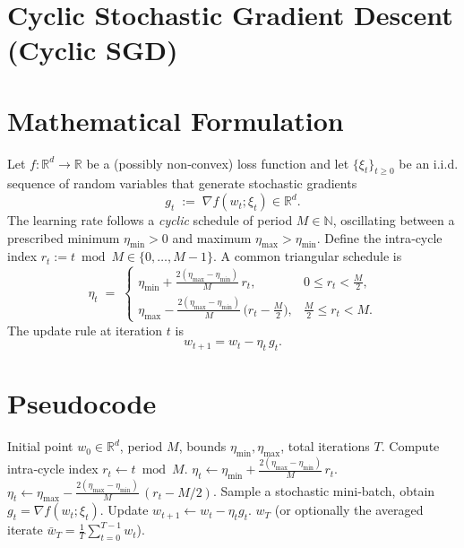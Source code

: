 \documentclass{article}
\newcommand{\R}{\mathbb{R}}
\begin{document}
\section*{Cyclic Stochastic Gradient Descent (Cyclic SGD)}

\section*{Mathematical Formulation}
Let $f:\R^{d}\rightarrow\R$ be a (possibly non‑convex) loss function and let
$\{ \xi_t\}_{t\ge 0}$ be an i.i.d. sequence of random variables that generate
stochastic gradients 
\[
g_t \;:=\; \nabla f(w_t;\xi_t)\in\R^{d}.
\]
The learning rate follows a \emph{cyclic} schedule of period $M\in\mathbb{N}$,
oscillating between a prescribed minimum $\eta_{\min}>0$ and maximum
$\eta_{\max}> \eta_{\min}$.  
Define the intra‑cycle index $r_t:=t\bmod M\in\{0,\dots,M-1\}$.  
A common triangular schedule is
\[
\boxed{
\eta_t \;=\;
\begin{cases}
\displaystyle 
\eta_{\min}+\frac{2(\eta_{\max}-\eta_{\min})}{M}\,r_t,
      & 0\le r_t < \frac{M}{2},\\[2ex]
\displaystyle 
\eta_{\max}-\frac{2(\eta_{\max}-\eta_{\min})}{M}\,
      \bigl(r_t-\tfrac{M}{2}\bigr),
      & \frac{M}{2}\le r_t < M .
\end{cases}}
\tag{1}
\]
The update rule at iteration $t$ is
\[
\boxed{ \; w_{t+1}= w_t - \eta_t\, g_t .\; } \tag{2}
\]

\section*{Pseudocode}
\begin{algorithm}[H]
\caption{Cyclic SGD}
\begin{algorithmic}[1]
\REQUIRE Initial point $w_0\in\R^{d}$, period $M$, bounds $\eta_{\min},\eta_{\max}$,
total iterations $T$.
    \STATE Compute intra‑cycle index $r_t \gets t \bmod M$.
        \STATE $\eta_t \gets \eta_{\min}+ \frac{2(\eta_{\max}-\eta_{\min})}{M}\,r_t$.
    \ELSE
        \STATE $\eta_t \gets \eta_{\max}- \frac{2(\eta_{\max}-\eta_{\min})}{M}\,
               (r_t-M/2)$.
    \ENDIF
    \STATE Sample a stochastic mini‑batch, obtain $g_t = \nabla f(w_t;\xi_t)$.
    \STATE Update $w_{t+1}\gets w_t - \eta_t g_t$.
\ENDFOR
\ENSURE $w_T$ (or optionally the averaged iterate $\bar w_T=\frac1T\sum_{t=0}^{T-1}w_t$).
\end{algorithmic}
\end{algorithm}
\end{document}
